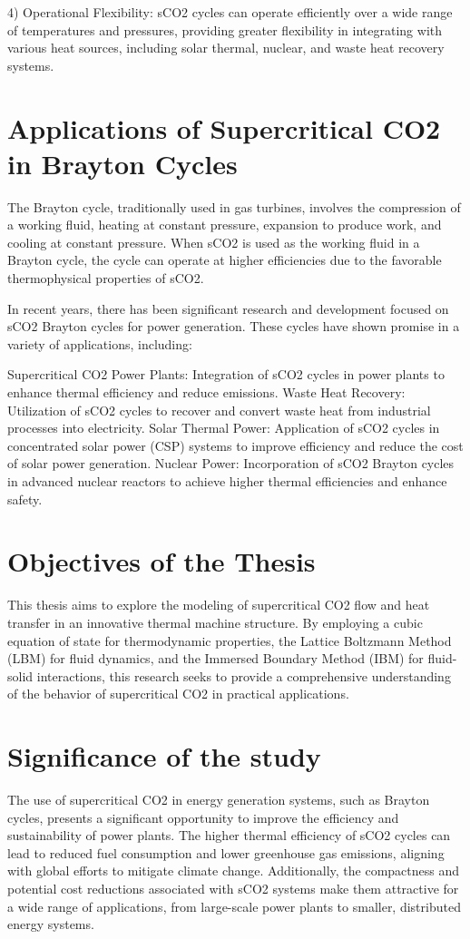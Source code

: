 4) Operational Flexibility: sCO2 cycles can operate efficiently over a wide range of temperatures and pressures, providing greater flexibility in integrating with various heat sources, including solar thermal, nuclear, and waste heat recovery systems.

\section*{Applications of Supercritical CO2 in Brayton Cycles}
The Brayton cycle, traditionally used in gas turbines, involves the compression of a working fluid, heating at constant pressure, expansion to produce work, and cooling at constant pressure. When sCO2 is used as the working fluid in a Brayton cycle, the cycle can operate at higher efficiencies due to the favorable thermophysical properties of sCO2.

In recent years, there has been significant research and development focused on sCO2 Brayton cycles for power generation. These cycles have shown promise in a variety of applications, including:

    Supercritical CO2 Power Plants: Integration of sCO2 cycles in power plants to enhance thermal efficiency and reduce emissions.
    Waste Heat Recovery: Utilization of sCO2 cycles to recover and convert waste heat from industrial processes into electricity.
    Solar Thermal Power: Application of sCO2 cycles in concentrated solar power (CSP) systems to improve efficiency and reduce the cost of solar power generation.
    Nuclear Power: Incorporation of sCO2 Brayton cycles in advanced nuclear reactors to achieve higher thermal efficiencies and enhance safety.

\section*{Objectives of the Thesis}
This thesis aims to explore the modeling of supercritical CO2 flow and heat transfer in an innovative thermal machine structure. By employing a cubic equation of state for thermodynamic
properties, the Lattice Boltzmann Method (LBM) for fluid dynamics, and the Immersed Boundary Method (IBM) for fluid-solid interactions, this research seeks to provide a comprehensive
understanding of the behavior of supercritical CO2 in practical applications.

\section*{Significance of the study}
The use of supercritical CO2 in energy generation systems, such as Brayton cycles, presents a significant opportunity to improve the efficiency and sustainability of power plants.
The higher thermal efficiency of sCO2 cycles can lead to reduced fuel consumption and lower greenhouse gas emissions, aligning with global efforts to mitigate climate change. 
Additionally, the compactness and potential cost reductions associated with sCO2 systems make them attractive for a wide range of applications, from large-scale power plants 
to smaller, distributed energy systems.

